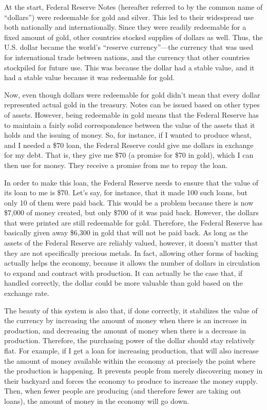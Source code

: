 At the start, Federal Reserve Notes (hereafter referred to by the common
name of “dollars”) were redeemable for gold and silver. This led to
their widespread use both nationally and internationally. Since they
were readily redeemable for a fixed amount of gold, other countries
stocked supplies of dollars as well. Thus, the U.S. dollar became the
world’s “reserve currency”—the currency that was used for international
trade between nations, and the currency that other countries stockpiled
for future use. This was because the dollar had a stable value, and it
had a stable value because it was redeemable for gold.

Now, even though dollars were redeemable for gold didn’t mean that every
dollar represented actual gold in the treasury. Notes can be issued
based on other types of assets. However, being redeemable in gold means
that the Federal Reserve has to maintain a fairly solid correspondence
between the value of the assets that it holds and the issuing of money.
So, for instance, if I wanted to produce wheat, and I needed a \$70
loan, the Federal Reserve could give me dollars in exchange for my
debt. That is, they give me \$70 (a promise for \$70 in gold), which I
can then use for money. They receive a promise from me to repay the
loan. 

In order to make this loan, the Federal Reserve needs to ensure that the
value of its loan to me is \$70. Let’s say, for instance, that it made
100 such loans, but only 10 of them were paid back. This would be a
problem because there is now \$7,000 of money created, but only \$700
of it was paid back. However, the dollars that were printed are still
redeemable for gold. Therefore, the Federal Reserve has basically given
away \$6,300 in gold that will not be paid back. As long as the assets
of the Federal Reserve are reliably valued, however, it doesn’t matter
that they are not specifically precious metals. In fact, allowing other
forms of backing actually helps the economy, because it allows the
number of dollars in circulation to expand and contract with
production. It can actually be the case that, if handled correctly, the
dollar could be more valuable than gold based on the exchange rate.

The beauty of this system is also that, if done correctly, it stabilizes
the value of the currency by increasing the amount of money when there
is an increase in production, and decreasing the amount of money when
there is a decrease in production. Therefore, the purchasing power of
the dollar should stay relatively flat.
For example, if I get
a loan for increasing production, that will also increase the amount of
money available within the economy at precisely the point where the
production is happening. It prevents people from merely discovering
money in their backyard and forces the economy to produce to increase
the money supply. Then, when fewer people are producing (and therefore
fewer are taking out loans), the amount of money in the economy will go
down.

